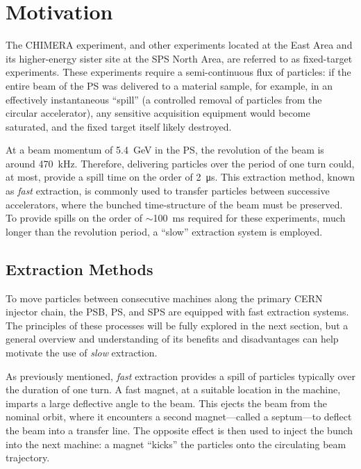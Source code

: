 \documentclass[11pt]{report}
\begin{document}
\section{Motivation}\label{sec:motivation}

The CHIMERA experiment, and other experiments located at the East Area and its higher-energy sister site at the SPS North Area, are referred to as fixed-target experiments. These experiments require a semi-continuous flux of particles: if the entire beam of the PS was delivered to a material sample, for example, in an effectively instantaneous ``spill'' (a controlled removal of particles from the circular accelerator), any sensitive acquisition equipment would become saturated, and the fixed target itself likely destroyed.

At a beam momentum of \qty{5.4}{\giga\electronvolt} in the PS, the revolution of the beam is around \qty{470}{kHz}. Therefore, delivering particles over the period of one turn could, at most, provide a spill time on the order of \qty{2}{\micro\second}. This extraction method, known as \textit{fast} extraction, is commonly used to transfer particles between successive accelerators, where the bunched time-structure of the beam must be preserved. To provide spills on the order of $\sim$\qty{100}{\ms} required for these experiments, much longer than the revolution period, a ``slow'' extraction system is employed.

\subsection{Extraction Methods}

To move particles between consecutive machines along the primary CERN injector chain, the PSB, PS, and SPS are equipped with fast extraction systems. The principles of these processes will be fully explored in the next section, but a general overview and understanding of its benefits and disadvantages can help motivate the use of \textit{slow} extraction. 

As previously mentioned, \textit{fast} extraction provides a spill of particles typically over the duration of one turn. A fast magnet, at a suitable location in the machine, imparts a large deflective angle to the beam. This ejects the beam from the nominal orbit, where it encounters a second magnet---called a septum---to deflect the beam into a transfer line. The opposite effect is then used to inject the bunch into the next machine: a magnet ``kicks'' the particles onto the circulating beam trajectory.
\end{document}
